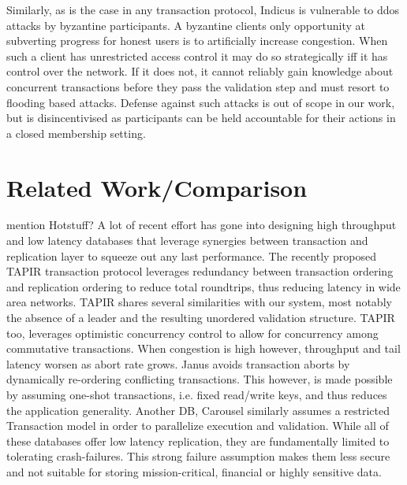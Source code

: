 Similarly, as is the case in any transaction protocol, Indicus is vulnerable to ddos attacks by byzantine participants. A byzantine clients only opportunity at subverting progress for honest users is to artificially increase congestion. When such a client has unrestricted access control it may do so strategically iff it has control over the network. If it does not, it cannot reliably gain knowledge about concurrent transactions before they pass the validation step and must resort to flooding based attacks. Defense against such attacks is out of scope in our work, but is disincentivised as participants can be held accountable for their actions in a closed membership setting.


\section{Related Work/Comparison}  mention Hotstuff?
A lot of recent effort has gone into designing high throughput and low latency databases that leverage synergies between transaction and replication layer to squeeze out any last performance. The recently proposed TAPIR transaction protocol leverages redundancy between transaction ordering and replication ordering to reduce total roundtrips, thus reducing latency in wide area networks. TAPIR shares several similarities with our system, most notably the absence of a leader and the resulting unordered validation structure. TAPIR too, leverages optimistic concurrency control to allow for concurrency among commutative transactions. When congestion is high however, throughput and tail latency worsen as abort rate grows. Janus avoids transaction aborts by dynamically re-ordering conflicting transactions. This however, is made possible by assuming one-shot transactions, i.e. fixed read/write keys, and thus reduces the application generality. Another DB, Carousel similarly assumes a restricted Transaction model in order to parallelize execution and validation. While all of these databases offer low latency replication, they are fundamentally limited to tolerating crash-failures. This strong failure assumption makes them less secure and not suitable for storing mission-critical, financial or highly sensitive data. 
